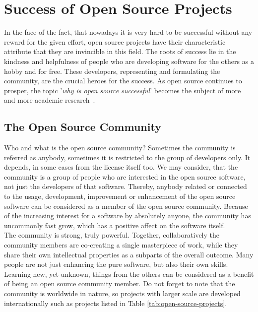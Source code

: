 \documentclass[12pt,a4paper]{article}
\theoremstyle{definition}
\begin{document}
\section{Success of Open Source Projects}

    In the face of the fact, that nowadays it is very hard to be successful without any reward for the given effort, open source projects have their characteristic attribute that they are invincible in this field. The roots of success lie in the kindness and helpfulness of people who are developing software for the others as a hobby and for free. These developers, representing and formulating the community, are the crucial heroes for the success. As open source continues to prosper, the topic '\textit{why is open source successful}' becomes the subject of more and more academic research~\cite{IEEE:open-source-success}.

    \subsection{The Open Source Community}

    Who and what is the open source community? Sometimes the community is referred as anybody, sometimes it is restricted to the group of developers only. It depends, in some cases from the license itself too. We may consider, that the community is a group of people who are interested in the open source software, not just the developers of that software. Thereby, anybody related or connected to the usage, development, improvement or enhancement of the open source software can be considered as a member of the open source community. Because of the increasing interest for a software by absolutely anyone, the community has uncommonly fast grow, which has a positive affect on the software itself.\\

    The community is strong, truly powerful. Together, collaboratively the community members are co-creating a single masterpiece of work, while they share their own intellectual properties as a subparts of the overall outcome. Many people are not just enhancing the pure software, but also their own skills. Learning new, yet unknown, things from the others can be considered as a benefit of being an open source community member. Do not forget to note that the community is worldwide in nature, so projects with larger scale are developed internationally such as projects listed in Table \ref{tab:open-source-projects}.
\end{document}
